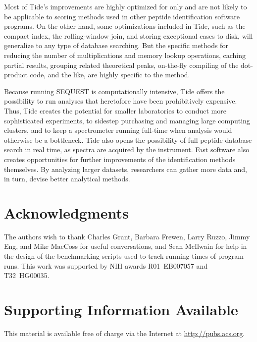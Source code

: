 
Most of Tide's improvements are highly optimized for \XCorr only and
are not likely to be applicable to scoring methods used in other
peptide identification software programs. On the other hand, some
optimizations included in Tide, such as the compact index, the
rolling-window join, and storing exceptional cases to disk, 
will generalize to any type of database searching. But
the specific methods for reducing the number of multiplications and
memory lookup operations, caching partial results, grouping related
theoretical peaks, on-the-fly compiling of the dot-product code, and
the like, are highly specific to the \XCorr method.

Because running SEQUEST is computationally intensive, Tide offers the
possibility to run analyses that heretofore have been prohibitively
expensive. Thus, Tide creates the potential for smaller laboratories
to conduct more sophisticated experiments, to sidestep purchasing and
managing large computing clusters, and to keep a spectrometer running
full-time when analysis would otherwise be a bottleneck. Tide also
opens the possibility of full peptide database search in real time, as
spectra are acquired by the instrument. Fast software also creates
opportunities for further improvements of the identification methods
themselves. By analyzing larger datasets, researchers can gather more
data and, in turn, devise better analytical methods.


\section*{Acknowledgments}

The authors wish to thank Charles Grant, Barbara Frewen, Larry Ruzzo,
Jimmy Eng, and Mike MacCoss for useful conversations, and Sean
McIlwain for help in the design of the benchmarking scripts used to
track running times of program runs. This work was supported by NIH
awards R01~EB007057 and T32~HG00035.

\section*{Supporting Information Available}

This material is available free of charge via the Internet at
\url{http://pubs.acs.org}.

